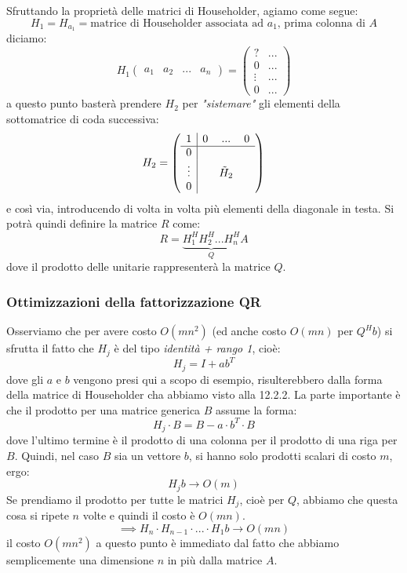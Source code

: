 \documentclass[a4paper,11pt]{article}
\begin{document}
Sfruttando la proprietà delle matrici di Householder, agiamo come segue:
$$
H_1 = H_{a_1} = \text{matrice di Householder associata ad $a_1$, prima colonna di $A$}
$$
diciamo:
$$
H_1 \begin{pmatrix}
	a_1 & a_2 & ... & a_n
\end{pmatrix} =
\begin{pmatrix}
	? & ... \\
	0 & ... \\ 
	\vdots & ... \\ 
	0 & ...
\end{pmatrix}
$$
a questo punto basterà prendere $H_2$ per \textit{"sistemare"} gli elementi della sottomatrice di coda successiva:
$$
H_2 = \left( \begin{array}{c| c c c}
	1 & 0 & ... & 0 \\
	\hline
	0 & & & \\
	\vdots & & \tilde{H}_2 & \\
	0 & & & \\
\end{array} \right)
$$
e così via, introducendo di volta in volta più elementi della diagonale in testa.
Si potrà quindi definire la matrice $R$ come:
$$
R = \underbrace{H_1^H H_2^H ... H_n^H}_Q A
$$
dove il prodotto delle unitarie rappresenterà la matrice $Q$.

\subsubsection{Ottimizzazioni della fattorizzazione QR}
Osserviamo che per avere costo $O(mn^2)$ (ed anche costo $O(mn)$ per $Q^H b$) si sfrutta il fatto che $H_j$ è del tipo \textit{identità + rango 1}, cioè:
$$
H_j = I + a b^T
$$
dove gli $a$ e $b$ vengono presi qui a scopo di esempio, risulterebbero dalla forma della matrice di Householder cha abbiamo visto alla 12.2.2.
La parte importante è che il prodotto per una matrice generica $B$ assume la forma:
$$
H_j \cdot B = B - a \cdot b^T \cdot B
$$
dove l'ultimo termine è il prodotto di una colonna per il prodotto di una riga per $B$.
Quindi, nel caso $B$ sia un vettore $b$, si hanno solo prodotti scalari di costo $m$, ergo:
$$
H_j b \rightarrow O(m)
$$
Se prendiamo il prodotto per tutte le matrici $H_j$, cioè per $Q$, abbiamo che questa cosa si ripete $n$ volte e quindi il costo è $O(mn)$.
$$
\implies H_n \cdot H_{n - 1} \cdot ... \cdot H_1 b \rightarrow O(mn)
$$
il costo $O(mn^2)$ a questo punto è immediato dal fatto che abbiamo semplicemente una dimensione $n$ in più dalla matrice $A$.
\end{document}
